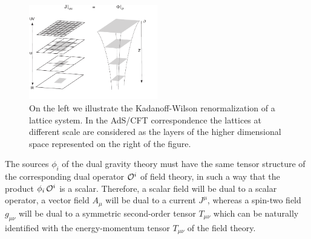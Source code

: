 \documentclass[12pt,notitlepage]{article}
\begin{document}
\begin{figure}[ht]
\center
\includegraphics[width=0.5\textwidth]{kada.pdf}
\caption{On the left we illustrate the Kadanoff-Wilson renormalization of a lattice system. In the AdS/CFT correspondence the lattices at different scale are considered as the  layers of the higher dimensional space represented on the right of the figure.} 
\label{Kadanoff}
\end{figure}




The sources $\phi_i$ of the dual gravity theory must have the same tensor structure of the corresponding dual operator ${\cal O}^i$ of field theory, in such a way that the product $\phi_i\,{\cal O}^i$ is a scalar. Therefore, a scalar field will be dual to a scalar operator, a vector field $A_{\mu}$ will be dual to a current $J^{\mu}$, whereas a spin-two field $g_{\mu\nu}$ will be dual to a symmetric second-order tensor $T_{\mu\nu}$ which can be naturally identified with the energy-momentum tensor $T_{\mu\nu}$ of the field theory. 
\end{document}
